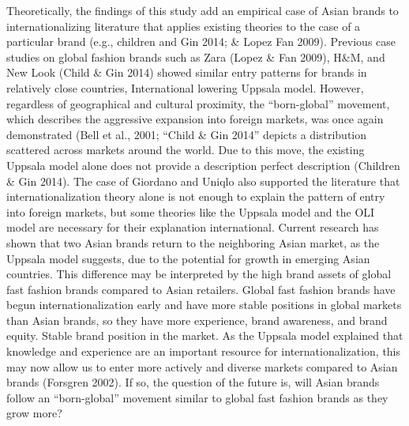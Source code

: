 \documentclass[12pt,]{article}
\begin{document}
Theoretically, the findings of this study add an empirical case of Asian
brands to internationalizing literature that applies existing theories
to the case of a particular brand (e.g., children and Gin 2014; \& Lopez
Fan 2009). Previous case studies on global fashion brands such as Zara
(Lopez \& Fan 2009), H\&M, and New Look (Child \& Gin 2014) showed
similar entry patterns for brands in relatively close countries,
International lowering Uppsala model. However, regardless of
geographical and cultural proximity, the ``born-global'' movement, which
describes the aggressive expansion into foreign markets, was once again
demonstrated (Bell et al., 2001; ``Child \& Gin 2014'' depicts a
distribution scattered across markets around the world. Due to this
move, the existing Uppsala model alone does not provide a description
perfect description (Children \& Gin 2014). The case of Giordano and
Uniqlo also supported the literature that internationalization theory
alone is not enough to explain the pattern of entry into foreign
markets, but some theories like the Uppsala model and the OLI model are
necessary for their explanation international. Current research has
shown that two Asian brands return to the neighboring Asian market, as
the Uppsala model suggests, due to the potential for growth in emerging
Asian countries. This difference may be interpreted by the high brand
assets of global fast fashion brands compared to Asian retailers. Global
fast fashion brands have begun internationalization early and have more
stable positions in global markets than Asian brands, so they have more
experience, brand awareness, and brand equity. Stable brand position in
the market. As the Uppsala model explained that knowledge and experience
are an important resource for internationalization, this may now allow
us to enter more actively and diverse markets compared to Asian brands
(Forsgren 2002). If so, the question of the future is, will Asian brands
follow an ``born-global'' movement similar to global fast fashion brands
as they grow more?
\end{document}
